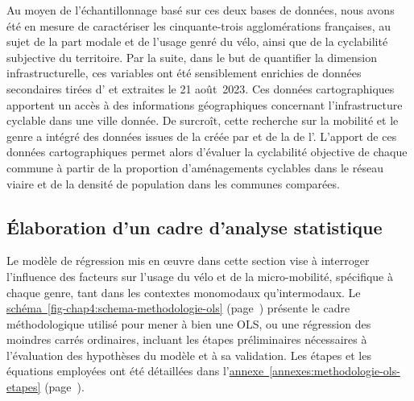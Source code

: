 \begin{refsegment}
Au moyen de l'échantillonnage basé sur ces deux bases de données, nous avons été en mesure de caractériser les cinquante-trois agglomérations françaises, au sujet de la part modale et de l'usage genré du vélo, ainsi que de la cyclabilité subjective du territoire. Par la suite, dans le but de quantifier la dimension infrastructurelle, ces variables ont été sensiblement enrichies de données secondaires tirées d'\textcolor{blue}{\textcite{openstreetmap_openstreetmap_2023}} et extraites le 21 août~2023. Ces données cartographiques apportent un accès à des informations géographiques concernant l'infrastructure cyclable dans une ville donnée. De surcroît, cette recherche sur la mobilité et le genre a intégré des données issues de la  créée par \textcolor{blue}{\textcite{velo__territoires_atlas_2023}} et de la  de l'\textcolor{blue}{\textcite{insee_grille_2021}}. L'apport de ces données cartographiques permet alors d'évaluer la cyclabilité objective de chaque commune à partir de la proportion d'aménagements cyclables dans le réseau viaire et de la densité de population dans les communes comparées.%

\subsection{Élaboration d'un cadre d'analyse statistique
    \label{chap4:methodologie-modele-ols}
    }

Le modèle de régression mis en œuvre dans cette section vise à interroger l'influence des facteurs sur l'usage du vélo et de la micro-mobilité, spécifique à chaque genre, tant dans les contextes monomodaux qu'intermodaux. Le \hyperref[fig-chap4:schema-methodologie-ols]{schéma~\ref{fig-chap4:schema-methodologie-ols}} (page~\pageref{fig-chap4:schema-methodologie-ols}) présente le cadre méthodologique utilisé pour mener à bien une \acrfull{OLS}, ou une régression des moindres carrés ordinaires, incluant les étapes préliminaires nécessaires à l'évaluation des hypothèses du modèle et à sa validation. Les étapes et les équations employées ont été détaillées dans l'\hyperref[annexes:methodologie-ols-etapes]{annexe~\ref{annexes:methodologie-ols-etapes}} (page~\pageref{annexes:methodologie-ols-etapes}).%


\end{refsegment}
